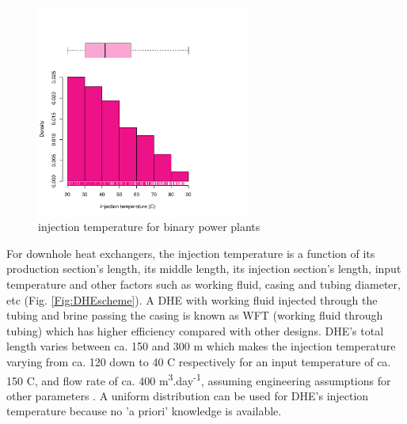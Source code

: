 \documentclass[review,authoryear, 12pt]{elsarticle}\usepackage[]{graphicx}\usepackage[]{color}
\newenvironment{knitrout}{}{} %
\begin{document}
\begin{knitrout}
\color{fgcolor}\begin{figure}[]


{\centering \includegraphics[width=7cm,height=7cm]{figure/injectionTemp} 

}

\caption[injection temperature for binary power plants]{injection temperature for binary power plants\label{Fig:injectionTemp}}
\end{figure}


\end{knitrout}


For downhole heat exchangers, the injection temperature is a function of  its production section's length, its middle length, its injection section's length, input temperature and other factors such as working fluid, casing and tubing diameter, etc (Fig. \ref{Fig:DHEscheme}). A DHE with working fluid injected through the tubing and brine passing the casing is known as WFT (working fluid through tubing) which has higher efficiency compared with other designs. DHE's total length varies between ca. 150 and 300 m which makes the injection temperature varying from ca. 120 down to 40 C respectively for an input temperature of ca. 150 C, and flow rate of ca. 400 m\textsuperscript{3}.day\textsuperscript{-1}, assuming engineering assumptions for other parameters \citep{feng2012numerical}. A uniform distribution can be used for DHE's injection temperature because no 'a priori' knowledge is available. 
\end{document}
